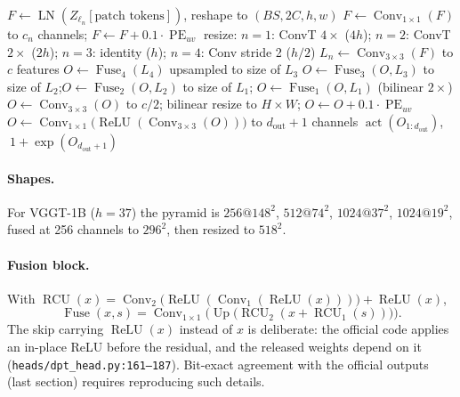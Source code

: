 \documentclass[11pt,a4paper]{article}
\newcommand{\src}[1]{\texttt{\small #1}}
\begin{document}
\begin{algorithm}[htbp]
\caption{DPT head (\texttt{DPTHead.\_forward\_impl}, \src{heads/dpt\_head.py:94--124})}
\begin{algorithmic}[1]
  \State $F \gets \operatorname{LN}(Z_{\ell_n}[\text{patch tokens}])$, reshape to $(BS, 2C, h, w)$
  \State $F \gets \operatorname{Conv}_{1\times1}(F)$ to $c_n$ channels; $F \gets F + 0.1\cdot\operatorname{PE}_{uv}$
  \State resize: $n{=}1$: ConvT $4{\times}$ ($4h$); $n{=}2$: ConvT $2{\times}$ ($2h$); $n{=}3$: identity ($h$); $n{=}4$: Conv stride 2 ($h/2$)
  \State $L_n \gets \operatorname{Conv}_{3\times3}(F)$ to $c$ features
\EndFor
\State $O \gets \operatorname{Fuse}_4(L_4)$ upsampled to size of $L_3$
\State $O \gets \operatorname{Fuse}_3(O, L_3)$ to size of $L_2$;\quad $O \gets \operatorname{Fuse}_2(O, L_2)$ to size of $L_1$;\quad
       $O \gets \operatorname{Fuse}_1(O, L_1)$ (bilinear $2\times$)
\State $O \gets \operatorname{Conv}_{3\times3}(O)$ to $c/2$; bilinear resize to $H\times W$; $O \gets O + 0.1\cdot\operatorname{PE}_{uv}$
\State $O \gets \operatorname{Conv}_{1\times1}\big(\operatorname{ReLU}(\operatorname{Conv}_{3\times3}(O))\big)$ to $d_{\text{out}}+1$ channels
\State \Return $\operatorname{act}(O_{1:d_{\text{out}}})$, $\ 1 + \exp(O_{d_{\text{out}}+1})$
\end{algorithmic}
\end{algorithm}

\paragraph{Shapes.} For VGGT-1B ($h = 37$) the pyramid is $256@148^2$, $512@74^2$, $1024@37^2$, $1024@19^2$, fused at 256
channels to $296^2$, then resized to $518^2$.

\paragraph{Fusion block.} With $\operatorname{RCU}(x) = \operatorname{Conv}_2\big(\operatorname{ReLU}(\operatorname{Conv}_1(\operatorname{ReLU}(x)))\big) + \operatorname{ReLU}(x)$,
\[
  \operatorname{Fuse}(x, s) = \operatorname{Conv}_{1\times1}\Big(\operatorname{Up}\big(\operatorname{RCU}_2(x + \operatorname{RCU}_1(s))\big)\Big).
\]
The skip carrying $\operatorname{ReLU}(x)$ instead of $x$ is deliberate: the official code applies an in-place ReLU before the
residual, and the released weights depend on it (\src{heads/dpt\_head.py:161--187}). Bit-exact agreement with the official
outputs (last section) requires reproducing such details.
\end{document}
